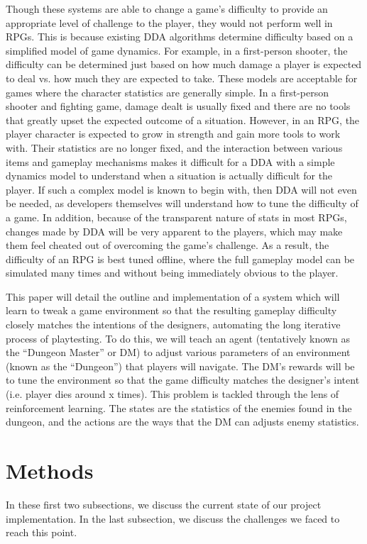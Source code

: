 \documentclass{article}
\begin{document}
Though these systems are able to change a game's difficulty to provide an appropriate level of challenge to the player, they would not perform well in RPGs. This is because existing DDA algorithms determine difficulty based on a simplified model of game dynamics. For example, in a first-person shooter, the difficulty can be determined just based on how much damage a player is expected to deal vs. how much they are expected to take. These models are acceptable for games where the character statistics are generally simple. In a first-person shooter and fighting game, damage dealt is usually fixed and there are no tools that greatly upset the expected outcome of a situation. However, in an RPG, the player character is expected to grow in strength and gain more tools to work with. Their statistics are no longer fixed, and the interaction between various items and gameplay mechanisms makes it difficult for a DDA with a simple dynamics model to understand when a situation is actually difficult for the player. If such a complex model is known to begin with, then DDA will not even be needed, as developers themselves will understand how to tune the difficulty of a game. In addition, because of the transparent nature of stats in most RPGs, changes made by DDA will be very apparent to the players, which may make them feel cheated out of overcoming the game's challenge. As a result, the difficulty of an RPG is best tuned offline, where the full gameplay model can be simulated many times and without being immediately obvious to the player.

This paper will detail the outline and implementation of a system which will learn to tweak a game environment so that the resulting gameplay difficulty closely matches the intentions of the designers, automating the long iterative process of playtesting.
To do this, we will teach an agent (tentatively known as the ``Dungeon Master'' or DM) to adjust various parameters of an environment (known as the ``Dungeon'') that players will navigate. The DM’s rewards will be to tune the environment so that the game difficulty matches the designer’s intent (i.e. player dies around x times). This problem is tackled through the lens of reinforcement learning. The states are the statistics of the enemies found in the dungeon, and the actions are the ways that the DM can adjusts enemy statistics.

\section{Methods}
In these first two subsections, we discuss the current state of our project implementation. In the last subsection, we discuss the challenges we faced to reach this point.
\end{document}
